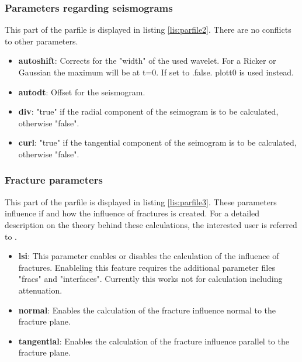 		\subsubsection{Parameters regarding seismograms}
			This part of the parfile is displayed in listing \ref{lis:parfile2}. There are no conflicts to other parameters.
			 
    		\begin{itemize}
    			\item \textbf{autoshift}: Corrects for the "width" of the used wavelet. For a Ricker or Gaussian the maximum will be at t=0. If set to .false. plott0 is used instead.
    			\item \textbf{autodt}: Offset for the seismogram.
    			\item \textbf{div}: "true" if the radial component of the seimogram is to be calculated, otherwise "false".
    			\item \textbf{curl}: "true" if the tangential component of the seimogram is to be calculated, otherwise "false".
    		\end{itemize}
    	\subsubsection{Fracture parameters}
			This part of the parfile is displayed in listing \ref{lis:parfile3}. These parameters influence if and how the influence of fractures is created. For a detailed description on the theory behind these calculations, the interested user is referred to \cite{moeller.2018}.
			 
    		\begin{itemize}
    			\item \textbf{lsi}: This parameter enables or disables the calculation of the influence of fractures. Enableling this feature requires the additional parameter files "fracs" and "interfaces". Currently this works not for calculation including attenuation.
    			\item \textbf{normal}: Enables the calculation of the fracture influence normal to the fracture plane.
    			\item \textbf{tangential}: Enables the calculation of the fracture influence parallel to the fracture plane.
    		\end{itemize}
